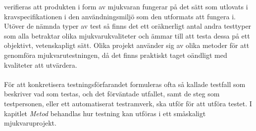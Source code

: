 verifieras att produkten i form av mjukvaran fungerar på det sätt som utlovats i kravspecifikationen i den användningsmiljö som den utformats att fungera i. Utöver de nämnda typer av test så finns det ett oräknerligt antal andra testtyper som alla betraktar olika mjukvarukvaliteter och ämmar till att testa dessa på ett objektivt, vetenskapligt sätt. Olika projekt använder sig av olika metoder för att genomföra mjukvarutestningen, då det finns praktiskt taget oändligt med kvaliteter att utvärdera. \\
\\
För att konkretisera testningsförfarandet formuleras ofta så kallade testfall som beskriver vad som testas, och det förväntade utfallet, samt de steg som testpersonen, eller ett automatiserat testramverk, ska utför för att utföra testet. I kapitlet \emph{Metod} behandlas hur testning kan utföras i ett småskaligt mjukvaruprojekt.




